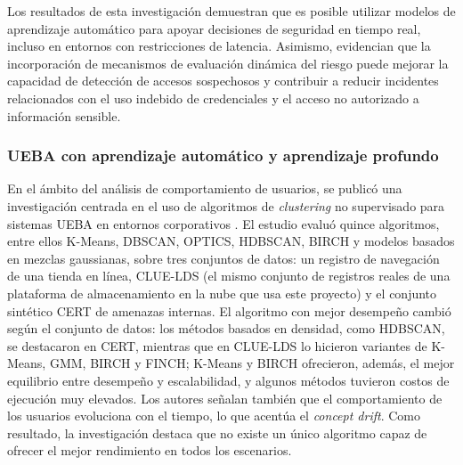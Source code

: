 Los resultados de esta investigación demuestran que es posible utilizar modelos de aprendizaje automático para apoyar decisiones de seguridad en tiempo real, incluso en entornos con restricciones de latencia. Asimismo, evidencian que la incorporación de mecanismos de evaluación dinámica del riesgo puede mejorar la capacidad de detección de accesos sospechosos y contribuir a reducir incidentes relacionados con el uso indebido de credenciales y el acceso no autorizado a información sensible.

\subsubsection{UEBA con aprendizaje automático y aprendizaje profundo}\label{sec:ea-ueba-dl}
En el ámbito del análisis de comportamiento de usuarios, se publicó una investigación centrada en el uso de algoritmos de \emph{clustering} no supervisado para sistemas UEBA en entornos corporativos \parencite{Artioli2024}. El estudio evaluó quince algoritmos, entre ellos K-Means, DBSCAN, OPTICS, HDBSCAN, BIRCH y modelos basados en mezclas gaussianas, sobre tres conjuntos de datos: un registro de navegación de una tienda en línea, CLUE-LDS (el mismo conjunto de registros reales de una plataforma de almacenamiento en la nube que usa este proyecto) y el conjunto sintético CERT de amenazas internas. El algoritmo con mejor desempeño cambió según el conjunto de datos: los métodos basados en densidad, como HDBSCAN, se destacaron en CERT, mientras que en CLUE-LDS lo hicieron variantes de K-Means, GMM, BIRCH y FINCH; K-Means y BIRCH ofrecieron, además, el mejor equilibrio entre desempeño y escalabilidad, y algunos métodos tuvieron costos de ejecución muy elevados. Los autores señalan también que el comportamiento de los usuarios evoluciona con el tiempo, lo que acentúa el \emph{concept drift}. Como resultado, la investigación destaca que no existe un único algoritmo capaz de ofrecer el mejor rendimiento en todos los escenarios.


